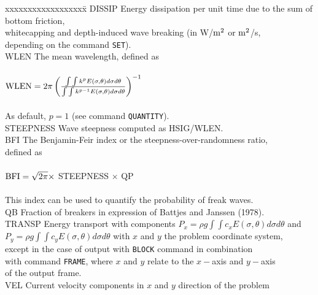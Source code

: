 \documentclass[12pt]{book}
\begin{document}
\begin{tabbing}
xxxxxxxxxxxxxxxxxx\= \kill
DISSIP               \> Energy dissipation per unit time due to the sum of bottom friction,\+\\
                        whitecapping and depth-induced
                        wave breaking (in W/${\rm m}^2$ or ${\rm m}^2$/s,\\
                        depending on the command {\tt SET}).\-\\
WLEN                 \> The mean wavelength, defined as\+\\
                        \\
${\rm WLEN} = 2\pi \left( \frac{\int \int k^{p} E(\sigma,\theta)d\sigma d\theta}{\int \int k^{p-1} E(\sigma,\theta)d\sigma d\theta} \right)^{-1}$ \\
                        \\
                        As default, $p=1$ (see command {\tt QUANTITY}).\-\\
STEEPNESS            \> Wave steepness computed as HSIG/WLEN.\\
BFI                  \> The Benjamin-Feir index or the steepness-over-randomness ratio,\+\\
                        defined as\\
                        \\
${\rm BFI} = \sqrt{2\pi} \times$ STEEPNESS $\times$ QP \\
                        \\
                        This index can be used to quantify the probability of freak waves.\-\\
QB                   \> Fraction of breakers in expression of Battjes and Janssen (1978).\\
TRANSP               \> Energy transport with components $P_x = \rho g\int \int c_x E(\sigma,\theta)d\sigma d\theta$ and\+\\
                        $P_y = \rho g\int \int c_y E(\sigma,\theta)d\sigma d\theta$
                        with $x$ and $y$ the problem coordinate system,\\
                        except in the case of output with {\tt BLOCK} command in combination\\
                        with command {\tt FRAME}, where $x$ and $y$ relate to the $x-$axis and $y-$axis\\
                        of the output frame.\-\\
VEL                  \> Current velocity components in $x$ and $y$ direction of the problem\+\\

\end{tabbing}
\end{document}
